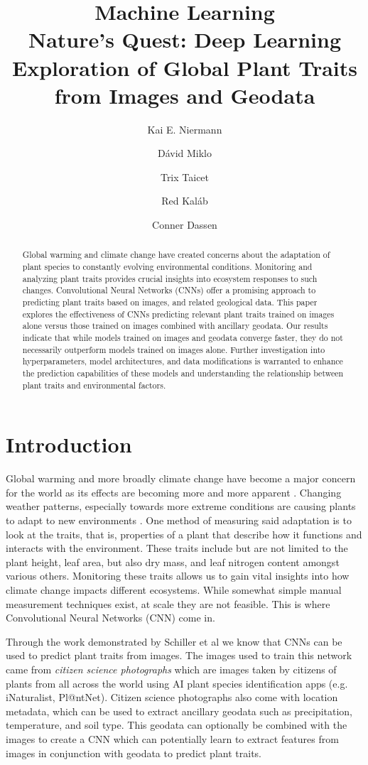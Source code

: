 \documentclass[12pt,a4paper,oneside]{article}
\title{
    \Huge{Machine Learning} \\ \LARGE 
    Nature's Quest: Deep Learning Exploration of Global Plant Traits from Images and Geodata
}
\author{
Kai E. Niermann \and
Dávid Miklo \and 
Trix Taicet \and
Red Kaláb \and
Conner Dassen
}
\date{\DTMusedate{date}}
\begin{document}
\maketitle

% 

\begin{abstract}
    Global warming and climate change have created concerns about the adaptation of plant species to constantly evolving environmental conditions. Monitoring and analyzing plant traits provides crucial insights into ecosystem responses to such changes. Convolutional Neural Networks (CNNs) offer a promising approach to predicting plant traits based on images, and related geological data. This paper explores the effectiveness of CNNs predicting relevant plant traits trained on images alone versus those trained on images combined with ancillary geodata. Our results indicate that while models trained on images and geodata converge faster, they do not necessarily outperform models trained on images alone. Further investigation into hyperparameters, model architectures, and data modifications is warranted to enhance the prediction capabilities of these models and understanding the relationship between plant traits and environmental factors.
\end{abstract}

\section{Introduction}
Global warming and more broadly climate change have become a major concern for the world as its effects are becoming more and more apparent \cite{WANG2023100237}. Changing weather patterns, especially towards more extreme conditions are causing plants to adapt to new environments \cite{GRAY201664}. One method of measuring said adaptation is to look at the traits, that is, properties of a plant that describe how it functions and interacts with the environment. These traits include but are not limited to the plant height, leaf area, but also dry mass, and leaf nitrogen content amongst various others. Monitoring these traits allows us to gain vital insights into how climate change impacts different ecosystems. While somewhat simple manual measurement techniques exist, at scale they are not feasible. This is where Convolutional Neural Networks (CNN) come in.  

\smallskip
Through the work demonstrated by Schiller et al \cite{schiller2021deep} we know that CNNs can be used to predict plant traits from images. The images used to train this network came from \textit{citizen science photographs} which are images taken by citizens of plants from all across the world using AI plant species identification apps (e.g. iNaturalist, Pl@ntNet). Citizen science photographs also come with location metadata, which can be used to extract ancillary geodata such as precipitation, temperature, and soil type. This geodata can optionally be combined with the images to create a CNN which can potentially learn to extract features from images in conjunction with geodata to predict plant traits.
\end{document}
